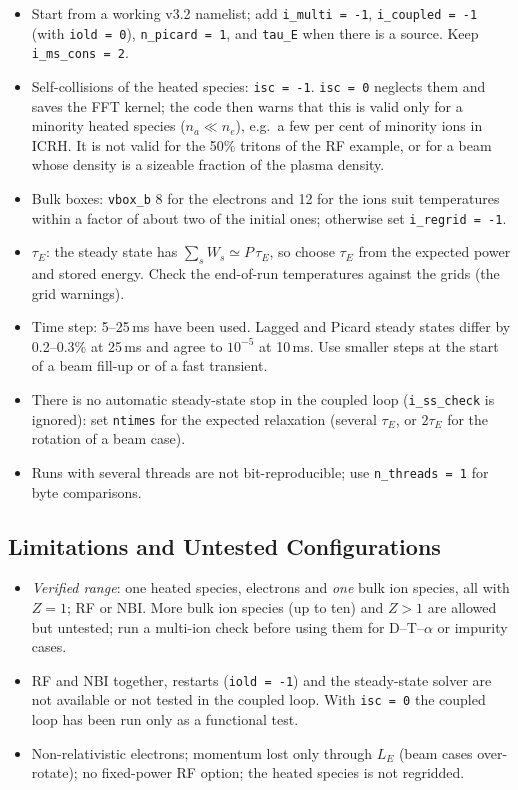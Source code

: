 \documentclass[11pt,a4paper]{article}
\begin{document}
\begin{itemize}
\item Start from a working v3.2 namelist; add \texttt{i\_multi = -1}, \texttt{i\_coupled = -1}
  (with \texttt{iold = 0}), \texttt{n\_picard = 1}, and \texttt{tau\_E} when there is a
  source.  Keep \texttt{i\_ms\_cons = 2}.
\item Self-collisions of the heated species: \texttt{isc = -1}.  \texttt{isc = 0} neglects them and
  saves the FFT kernel; the code then warns that this is valid only for a minority heated species
  ($n_a\ll n_e$), e.g.\ a few per cent of minority ions in ICRH.  It is not valid for the 50\%
  tritons of the RF example, or for a beam whose density is a sizeable fraction of the plasma
  density.
\item Bulk boxes: \texttt{vbox\_b} 8 for the electrons and 12 for the ions suit temperatures within a
  factor of about two of the initial ones; otherwise set \texttt{i\_regrid = -1}.
\item $\tau_E$: the steady state has $\sum_sW_s\simeq P\,\tau_E$, so choose $\tau_E$ from the expected power
  and stored energy.  Check the end-of-run temperatures against the grids (the grid warnings).
\item Time step: 5--25\,ms have been used.  Lagged and Picard steady states differ by 0.2--0.3\% at
  25\,ms and agree to $10^{-5}$ at 10\,ms.  Use smaller steps at the start of a beam fill-up or of a
  fast transient.
\item There is no automatic steady-state stop in the coupled loop (\texttt{i\_ss\_check} is ignored):
  set \texttt{ntimes} for the expected relaxation (several $\tau_E$, or $2\tau_E$ for the rotation of a
  beam case).
\item Runs with several threads are not bit-reproducible; use \texttt{n\_threads = 1} for byte
  comparisons.
\end{itemize}

\subsection{Limitations and Untested Configurations}

\begin{itemize}
\item \emph{Verified range}: one heated species, electrons and \emph{one} bulk ion species, all with
  $Z=1$; RF or NBI.  More bulk ion species (up to ten) and $Z>1$ are allowed but untested; run a
  multi-ion check before using them for D--T--$\alpha$ or impurity cases.
\item RF and NBI together, restarts (\texttt{iold = -1}) and the steady-state solver are not available
  or not tested in the coupled loop.  With \texttt{isc = 0} the coupled loop has been run only as a
  functional test.
\item Non-relativistic electrons; momentum lost only through $L_E$ (beam cases over-rotate); no
  fixed-power RF option; the heated species is not regridded.
\end{itemize}
\end{document}
